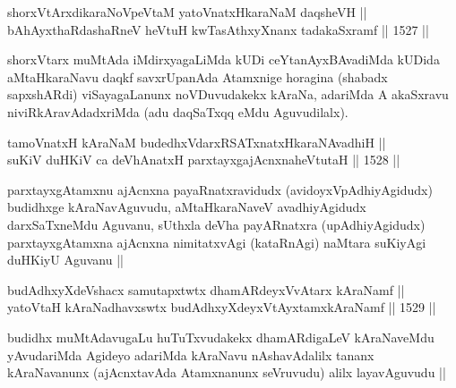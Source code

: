 
\begin{shl}
shorxVtArxdikaraNoVpeVtaM yatoV\s natxHkaraNaM daqsheVH || \\
bAhAyxthaRdashaRneV heVtuH kwTasAthxyXnanx tadakaSxramf ||  1527 ||  
\end{shl}

\begin{artha}
shorxVtarx muMtAda iMdirxyagaLiMda kUDi ceYtanAyxBAvadiMda kUDida aMtaHkaraNavu daqkf savxrUpanAda Atamxnige horagina (shabadx sapxshARdi) viSayagaLanunx noVDuvudakekx kAraNa, adariMda A akaSxravu niviRkAravAdadxriMda (adu daqSaTxqq eMdu Aguvudilalx).
\end{artha}


\begin{shl}
tamoVnatxH kAraNaM budedhxVdarxRSATx\s natxHkaraNAvadhiH ||  \\
suKiV duHKiV ca deVhAnatxH parxtayxgajAcnxnaheVtutaH ||  1528 ||  
\end{shl}

\begin{artha}
parxtayxgAtamxnu ajAcnxna payaRnatxravidudx (avidoyxVpAdhiyAgidudx) budidhxge kAraNavAguvudu, aMtaHkaraNaveV avadhiyAgidudx darxSaTxneMdu Aguvanu, sUthxla deVha payARnatxra (upAdhiyAgidudx) parxtayxgAtamxna ajAcnxna nimitatxvAgi (kataRnAgi) naMtara suKiyAgi duHKiyU Aguvanu ||
\end{artha}


\begin{shl}
budAdhxyXdeVshacx samutapxtwtx dhamARdeyxVvAtarx kAraNamf || \\
yatoV\s taH kAraNadhavxswtx budAdhxyXdeyxVtAyxtamxkAraNamf ||  1529 ||  
\end{shl}

\begin{artha}
budidhx muMtAdavugaLu huTuTxvudakekx dhamARdigaLeV kAraNaveMdu yAvudariMda Agideyo adariMda kAraNavu nAshavAdalilx tananx kAraNavanunx (ajAcnxtavAda Atamxnanunx seVruvudu) alilx layavAguvudu ||
\end{artha}


